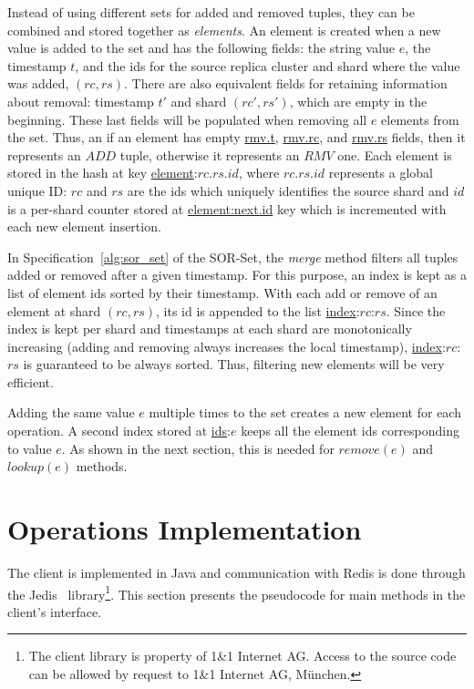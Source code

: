 Instead of using different sets for added and removed tuples, they can be
combined and stored together as \textit{elements}. An element is created when a
new value is added to the set and has the following fields: the string value
$e$, the timestamp $t$, and the ids for the source replica cluster and shard
where the value was added, $(rc, rs)$. There are also equivalent fields for
retaining information about removal: timestamp $t'$ and shard $(rc', rs')$,
which are empty in the beginning. These last fields will be populated when
removing all $e$ elements from the set. Thus, an if an element has empty
\underline{rmv.t}, \underline{rmv.rc}, and \underline{rmv.rs} fields, then it
represents an $ADD$ tuple, otherwise it represents an $RMV$ one. Each element is
stored in the hash at key \underline{element}:$rc.rs.id$, where $rc.rs.id$
represents a global unique ID: $rc$ and $rs$ are the ids which uniquely
identifies the source shard and $id$ is a per-shard counter stored at
\underline{element:next.id} key which is incremented with each new element
insertion.

In Specification~\ref{alg:sor_set} of the SOR-Set, the \textit{merge} method
filters all tuples added or removed after a given timestamp. For this purpose,
an index is kept as a list of element ids sorted by their timestamp. With each
add or remove of an element at shard $(rc, rs)$, its id is appended to the list
\underline{index}:$rc$:$rs$. Since the index is kept per shard and timestamps at
each shard are monotonically increasing (adding and removing always increases
the local timestamp), \underline{index}:$rc$:$rs$ is guaranteed to be always
sorted. Thus, filtering new elements will be very efficient.

Adding the same value $e$ multiple times to the set creates a new element for
each operation. A second index stored at \underline{ids}:$e$ keeps all the
element ids corresponding to value $e$. As shown in the next section, this is
needed for $\textit{remove}(e)$ and $\textit{lookup}(e)$ methods.

\section{Operations Implementation}
\label{sec:operations}

The client is implemented in Java and communication with Redis is done through
the Jedis~\cite{jedis} library\footnote{The client library is property of 1\&1
Internet AG. Access to the source code can be allowed by request to 1\&1
Internet AG, M{\"u}nchen.}. This section presents the pseudocode for main
methods in the client's interface.

